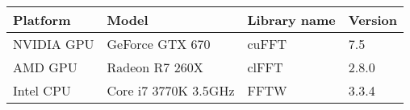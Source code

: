 \begin{tabular}{|l|l|l|l|}
	\hline
	Platform & Model & Library name & Version \\ \hline
	NVIDIA GPU & GeForce GTX 670 & cuFFT & 7.5 \\
	AMD GPU & Radeon R7 260X & clFFT & 2.8.0 \\ \hline
	Intel CPU & Core i7 3770K 3.5GHz & FFTW & 3.3.4 \\ \hline
\end{tabular}